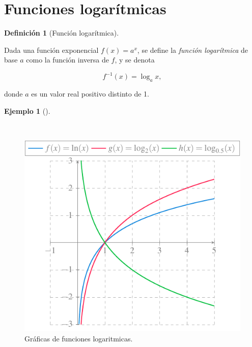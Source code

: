 \documentclass[
  a4paper,
]{scrreport}
\theoremstyle{definition}
\newtheorem{example}{Ejemplo}[chapter]
\theoremstyle{plain}
\theoremstyle{definition}
\newtheorem{definition}{Definición}[chapter]
\theoremstyle{definition}
\theoremstyle{plain}
\theoremstyle{plain}
\theoremstyle{remark}
\begin{document}
\section{Funciones logarítmicas}\label{funciones-logaruxedtmicas}

\begin{definition}[Función
logarítmica]\protect\hypertarget{def-funcion-logaritmica}{}\label{def-funcion-logaritmica}

Dada una función exponencial \(f(x)=a^x\), se define la \emph{función
logarítmica} de base \(a\) como la función inversa de \(f\), y se denota

\[f^{-1}(x)=\log_a x,\]

donde \(a\) es un valor real positivo distinto de 1.

\end{definition}

\begin{example}[]\protect\hypertarget{exm-funcion-logaritmica}{}\label{exm-funcion-logaritmica}

~

\begin{figure}[H]

{\centering \includegraphics{./img/funciones/funcion-logaritmica.pdf}

}

\caption{Gráficas de funciones logaritmicas.}

\end{figure}%

\end{example}
\end{document}
